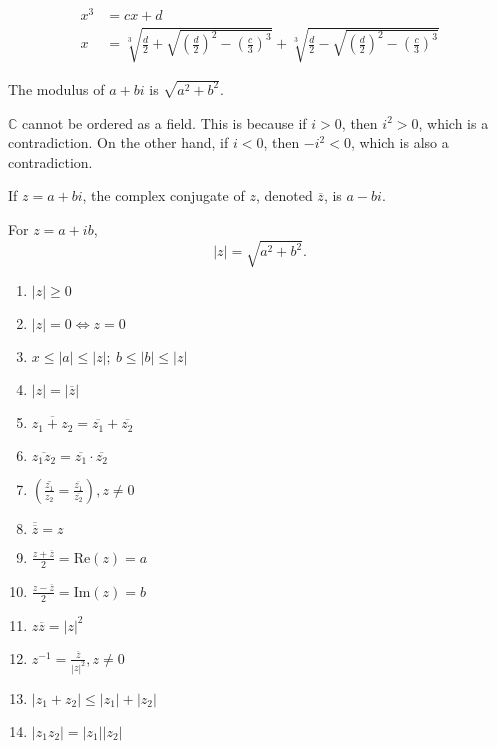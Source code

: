\documentclass{article}
\newcommand{\inv}{^{-1}}
\newcommand{\C}{\mathbb C}
\begin{document}
\pagecolor{black}
\color{white}


    \begin{align*}
        x^3 &= cx + d \\
        x &= \sqrt[3]{\frac d2 + \sqrt{\left(\frac d2\right)^2 - \left(\frac c3\right)^3}} + \sqrt[3]{\frac d2 - \sqrt{\left(\frac d2\right)^2 - \left(\frac c3\right)^3}}
    \end{align*}

\medskip
{}

	The modulus of $a+bi$ is $\sqrt{a^2+b^2}$.

\medskip
{}

	$\C$ cannot be ordered as a field. This is because if $i > 0$, then $i^2 > 0$, which is a contradiction. On the other hand, if $i < 0$, then $-i^2 < 0$, which is also a contradiction.

\medskip
{}

    If $z = a+bi$, the complex conjugate of $z$, denoted $\overline z$, is $a-bi$.

\medskip
{}

    For $z = a + ib$, $$|z| = \sqrt{a^2+b^2}.$$

\medskip
{}
    \begin{enumerate}
        \item $|z| \geq 0$
        \item $|z|=0 \iff z=0$
        \item $x \leq |a| \leq |z|; ~ b \leq |b| \leq |z|$
        \item $|z| = |\overline z|$
        \item $\overline{z_1 + z_2} = \overline{z_1} + \overline{z_2}$
        \item $\overline{z_1z_2} = \overline{z_1}\cdot\overline{z_2}$
        \item $\left( \overline{\frac{z_1}{z_2}} = \frac{\overline{z_1}}{\overline{z_2}} \right), z \neq 0$
        \item $\overline{\overline z} = z$
        \item $\frac{z + \overline z}2 = \text{Re}(z) = a$
        \item $\frac{z - \overline z}2 = \text{Im}(z) = b$
        \item $z \overline z = |z|^2$
        \item $z\inv = \frac{\overline z}{|z|^2}, z \neq 0$
        \item $|z_1 + z_2| \leq |z_1| + |z_2|$
        \item $|z_1z_2|=|z_1||z_2|$
    \end{enumerate}
\end{document}
